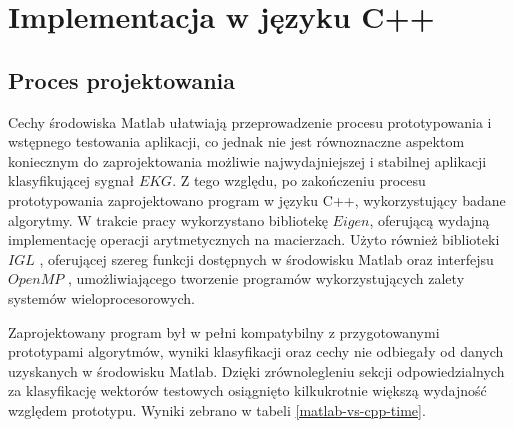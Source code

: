 \section{Implementacja w języku C++}
\subsection{Proces projektowania}
Cechy środowiska Matlab ułatwiają przeprowadzenie procesu prototypowania i wstępnego testowania aplikacji, co jednak nie jest równoznaczne aspektom koniecznym do zaprojektowania możliwie najwydajniejszej i stabilnej aplikacji klasyfikującej sygnał $EKG$. Z tego względu, po zakończeniu procesu prototypowania zaprojektowano program w języku C++, wykorzystujący badane algorytmy. W trakcie pracy wykorzystano bibliotekę $Eigen$, oferującą wydajną implementację operacji arytmetycznych na macierzach. Użyto również biblioteki $IGL$ \cite{libigl-www}, oferującej szereg funkcji dostępnych w środowisku Matlab oraz interfejsu $OpenMP$ \cite{openmp-www}, umożliwiającego tworzenie programów wykorzystujących zalety systemów wieloprocesorowych.

Zaprojektowany program był w pełni kompatybilny z przygotowanymi prototypami algorytmów, wyniki klasyfikacji oraz cechy nie odbiegały od danych uzyskanych w środowisku Matlab. Dzięki zrównolegleniu sekcji odpowiedzialnych za klasyfikację wektorów testowych osiągnięto kilkukrotnie większą wydajność względem prototypu. Wyniki zebrano w tabeli \ref{matlab-vs-cpp-time}.

